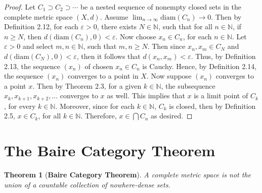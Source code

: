 \documentclass{article}
\newtheorem{theorem}{Theorem}[section]
\theoremstyle{definition}
\theoremstyle{remark}
\theoremstyle{definition}
\begin{document}
\begin{proof}
    Let $C_1\supset C_2\supset\cdots$ be a nested sequence of nonempty closed sets in the complete metric space $(X,d)$. Assume $\lim_{n\rightarrow\infty}\text{diam}(C_n)\rightarrow 0$. Then by Definition 2.12, for each $\varepsilon>0$, there exists $N\in\mathbb{N}$, such that for all $n\in\mathbb{N}$, if $n\geq N$, then $d(\text{diam}(C_n), 0)<\varepsilon$. Now choose $x_n\in C_n$, for each $n\in\mathbb{N}$. Let $\varepsilon>0$ and select $m,n\in\mathbb{N}$, such that $m,n\geq N$. Then since $x_n,x_m\in C_N$ and $d(\text{diam}(C_N),0)<\varepsilon$, then it follows that $d(x_n,x_m)<\varepsilon$. Thus, by Definition 2.13, the sequence $(x_n)$ of chosen $x_n\in C_n$ is Cauchy. Hence, by Definition 2.14, the sequence $(x_n)$ converges to a point in $X$. Now suppose $(x_n)$ converges to a point $x$. Then by Theorem 2.3, for a given $k\in\mathbb{N}$, the subsequence $x_k,x_{k+1},x_{k+2},\dots$ converges to $x$ as well. This implies that $x$ is a limit point of $C_k$, for every $k\in\mathbb{N}$. Moreover, since for each $k\in\mathbb{N}$, $C_k$ is closed, then by Definition 2.5, $x\in C_k$, for all $k\in\mathbb{N}$. Therefore, $x\in\bigcap C_n$ as desired.
\end{proof}

\section{The Baire Category Theorem}

\begin{theorem}[\textbf{Baire Category Theorem}] A complete metric space is not the union of a countable collection of nowhere-dense sets. 
\end{theorem}
\end{document}
